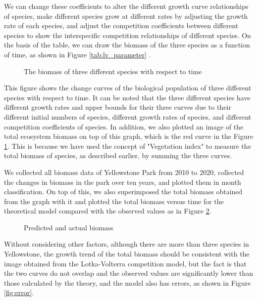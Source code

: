 \documentclass[12pt]{article}
\begin{document}
We can change these coefficients to alter the different growth curve relationships of species, make different species grow at different rates by adjusting the growth rate of each species, and adjust the competition coefficients between different species to show the interspecific competition relationships of different species. On the basis of the table, we can draw the biomass of the three species as a function of time, as shown in Figure \ref{tab:lv_parameter} .

\begin{figure}[htb]
	\centering
	
	\caption{The biomass of three different species with respect to time}
	\label{fig:population}
\end{figure}

This figure shows the change curves of the biological population of three different species with respect to time. It can be noted that the three different species have different growth rates and upper bounds for their three curves due to their different initial numbers of species, different growth rates of species, and different competition coefficients of species. In addition, we also plotted an image of the total ecosystem biomass on top of this graph, which is the red curve in the Figure \ref{fig:population}. This is because we have used the concept of "Vegetation index" to measure the total biomass of species, as described earlier, by summing the three curves.

We collected all biomass data of Yellowstone Park from 2010 to 2020, collected the changes in biomass in the park over ten years, and plotted them in month classification. On top of this, we also superimposed the total biomass obtained from the graph with it and plotted the total biomass versus time for the theoretical model compared with the observed values as in Figure \ref{fig:predict_and_actual}.

\begin{figure}[htb]
	\centering
	
	\caption{Predicted and actual biomass}
	\label{fig:predict_and_actual}
\end{figure}

Without considering other factors, although there are more than three species in Yellowstone, the growth trend of the total biomass should be consistent with the image obtained from the Lotka-Volterra competition model, but the fact is that the two curves do not overlap and the observed values are significantly lower than those calculated by the theory, and the model also has errors, as shown in Figure \ref{fig:error}.
\end{document}
